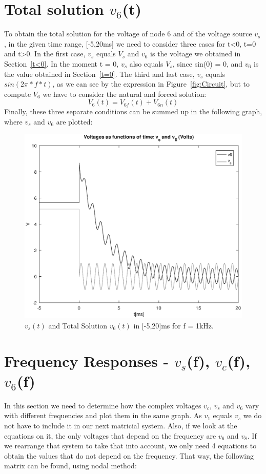 \section{Total solution $v_6$(t)}
To obtain the total solution for the voltage of node 6 and of the voltage source $v_s$, in the given time range, 
[-5,20ms] we need to consider three cases for t<0, t=0 and t>0.
In the first case, $v_s$ equals $V_s$ and $v_6$ is the voltage we obtained in Section~\ref{t<0}.
In the moment t = 0, $v_s$ also equals $V_s$, since sin(0) = 0, and $v_6$ is the value obtained in Section~\ref{t=0}.
The third and last case, $v_s$ equals $sin(2\pi*f*t)$, as we can see by the expression in Figure~\ref{fig:Circuit}, but to compute $V_6$ we have to consider the natural and forced solution:
\begin{equation}
{V_6}(t) = V_{6f}(t) + V_{6n}(t)
\label{eq:v6fcomplete}
\end{equation}
\noindent Finally, these three separate conditions can be summed up in the following graph, where $v_s$ and $v_6$ are plotted:
\begin{figure}[h!] \centering
\includegraphics[width=0.8\linewidth]{v6.eps}
\caption{$v_{s}(t)$ and Total Solution $v_{6}(t)$ in [-5,20]ms for f = 1kHz.}
\label{fig:v6t}
\end{figure}

\newpage
\section{Frequency Responses - $v_s$(f), $v_c$(f), $v_6$(f)}
In this section we need to determine how the complex voltages $v_c$, $v_s$ and $v_6$ vary with different frequencies 
and plot them in the same graph. As $v_1$ equals $v_s$ we do not have to include it in our next matricial system. 
Also, if we look at the equations on it, the only voltages that depend on the frequency are $v_6$ and $v_8$. 
If we rearrange that system to take that into account, we only need 4 equations to obtain the values that do not depend on the frequency. 
That way, the following matrix can be found, using nodal method:

